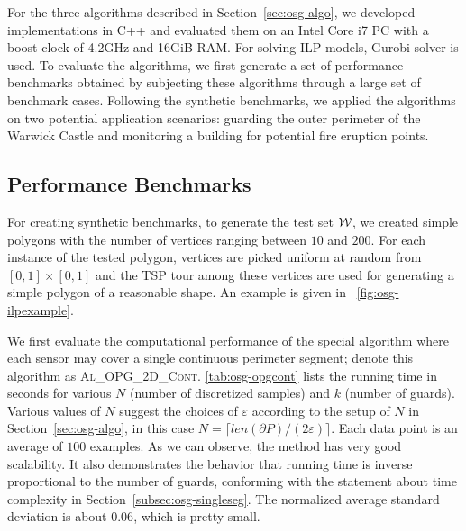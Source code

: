 For the three algorithms described in Section~\ref{sec:osg-algo}, we developed
implementations in C++ and evaluated them on an Intel Core i7 PC with a 
boost clock of 4.2GHz and 16GiB RAM. For solving ILP models, 
Gurobi solver \cite{optimization2019gurobi} is used. 
%
To evaluate the algorithms, we first generate a set of performance 
benchmarks obtained by subjecting these algorithms through a large set 
of benchmark cases. 
%
Following the synthetic benchmarks, we applied the algorithms on two 
potential application scenarios: guarding the outer perimeter of the 
Warwick Castle and monitoring a building for potential fire eruption 
points.
 
\subsection{Performance Benchmarks}
For creating synthetic benchmarks, to generate the test set $\mathcal W$, we 
created simple polygons with the number of vertices ranging between 
$10$ and $200$. 
%
For each instance of the tested polygon, vertices are picked uniform at 
random from $[0,1]\times[0,1]$ and the TSP tour among these vertices are 
used for generating a simple polygon of a reasonable shape.
%
An example is given in ~\ref{fig:osg-ilpexample}.

\def\opgtc{\textsc{Al\_OPG\_2D\_Cont}\xspace}
\def\opgtilp{\textsc{Al\_OPG\_2D\_ILP}\xspace}
\def\orgtilp{\textsc{Al\_ORG\_2D\_ILP}\xspace}
We first evaluate the computational performance of the special \opgt
algorithm where each sensor may cover a single continuous perimeter
segment; denote this algorithm as \opgtc.
%
\ref{tab:osg-opgcont} lists the running time in seconds for 
various $N$ (number of discretized samples) and $k$ (number of guards). 
Various values of $N$ suggest the choices of $\varepsilon$ according to 
the setup of $N$ in Section~\ref{sec:osg-algo}, in this case 
$N=\lceil {len(\partial P)}/{(2\varepsilon)} \rceil$.
Each data point is an average of $100$ examples. As we can observe, the 
method has very good scalability. It also demonstrates the behavior that 
running time is inverse proportional to the number of guards, 
conforming with the statement about time complexity in Section~\ref{subsec:osg-singleseg}. 
The normalized 
average standard deviation is about $0.06$, which is pretty small. 

